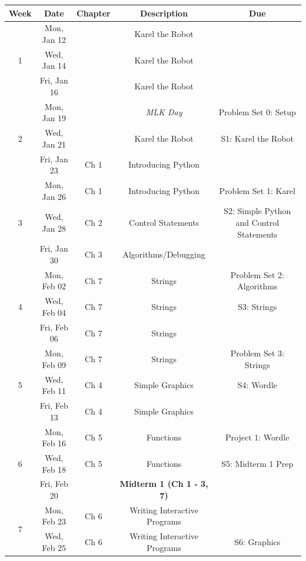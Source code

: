 \documentclass[varwidth]{standalone}
\begin{document}
\begin{longtable}{ccccc}
\toprule
Week & Date & Chapter & Description & Due \\
\midrule
\endhead
\multirow{3}{*}{1} & \multirow{1}{*}{Mon, Jan 12} &  & Karel the Robot &  \\
& \multirow{1}{*}{Wed, Jan 14} &  & Karel the Robot &  \\
& \multirow{1}{*}{Fri, Jan 16} &  & Karel the Robot &  \\
\midrule
\multirow{3}{*}{2} & \multirow{1}{*}{Mon, Jan 19} &  & \emph{MLK Day} & Problem Set 0: Setup 
\\
& \multirow{1}{*}{Wed, Jan 21} &  & Karel the Robot & S1: Karel the Robot \\
& \multirow{1}{*}{Fri, Jan 23} & Ch 1 & Introducing Python &  \\
\midrule
\multirow{3}{*}{3} & \multirow{1}{*}{Mon, Jan 26} & Ch 1 & Introducing Python & Problem Set 
1: Karel \\
& \multirow{1}{*}{Wed, Jan 28} & Ch 2 & Control Statements & S2: Simple Python and Control 
Statements \\
& \multirow{1}{*}{Fri, Jan 30} & Ch 3 & Algorithms/Debugging &  \\
\midrule
\multirow{3}{*}{4} & \multirow{1}{*}{Mon, Feb 02} & Ch 7 & Strings & Problem Set 2: 
Algorithms \\
& \multirow{1}{*}{Wed, Feb 04} & Ch 7 & Strings & S3: Strings \\
& \multirow{1}{*}{Fri, Feb 06} & Ch 7 & Strings &  \\
\midrule
\multirow{3}{*}{5} & \multirow{1}{*}{Mon, Feb 09} & Ch 7 & Strings & Problem Set 3: Strings 
\\
& \multirow{1}{*}{Wed, Feb 11} & Ch 4 & Simple Graphics & S4: Wordle \\
& \multirow{1}{*}{Fri, Feb 13} & Ch 4 & Simple Graphics &  \\
\midrule
\multirow{3}{*}{6} & \multirow{1}{*}{Mon, Feb 16} & Ch 5 & Functions & Project 1: Wordle \\
& \multirow{1}{*}{Wed, Feb 18} & Ch 5 & Functions & S5: Midterm 1 Prep \\
& \multirow{1}{*}{Fri, Feb 20} &  & \textbf{Midterm 1 (Ch 1 - 3, 7)} &  \\
\midrule
\multirow{3}{*}{7} & \multirow{1}{*}{Mon, Feb 23} & Ch 6 & Writing Interactive Programs &  \\
& \multirow{1}{*}{Wed, Feb 25} & Ch 6 & Writing Interactive Programs & S6: Graphics \\

\end{longtable}
\end{document}
